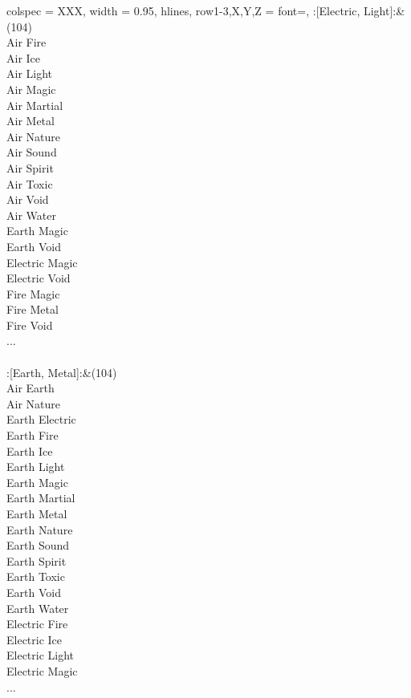 \begin{longtblr}[
	caption = {2v2 Attacking Effective},
	label = {2v2-Attacking-Effective},
]{
	colspec = {XXX}, width = 0.95\linewidth,
	hlines,
	row{1-3,X,Y,Z} = {font=\bfseries},
}
	:[Electric, Light]:&{(104)\\
	Air Fire \\
	Air Ice \\
	Air Light \\
	Air Magic \\
	Air Martial \\
	Air Metal \\
	Air Nature \\
	Air Sound \\
	Air Spirit \\
	Air Toxic \\
	Air Void \\
	Air Water \\
	Earth Magic \\
	Earth Void \\
	Electric Magic \\
	Electric Void \\
	Fire Magic \\
	Fire Metal \\
	Fire Void \\
	...\\
	}\\

	:[Earth, Metal]:&{(104)\\
	Air Earth \\
	Air Nature \\
	Earth Electric \\
	Earth Fire \\
	Earth Ice \\
	Earth Light \\
	Earth Magic \\
	Earth Martial \\
	Earth Metal \\
	Earth Nature \\
	Earth Sound \\
	Earth Spirit \\
	Earth Toxic \\
	Earth Void \\
	Earth Water \\
	Electric Fire \\
	Electric Ice \\
	Electric Light \\
	Electric Magic \\
	...\\
	}\\


\end{longtblr}
